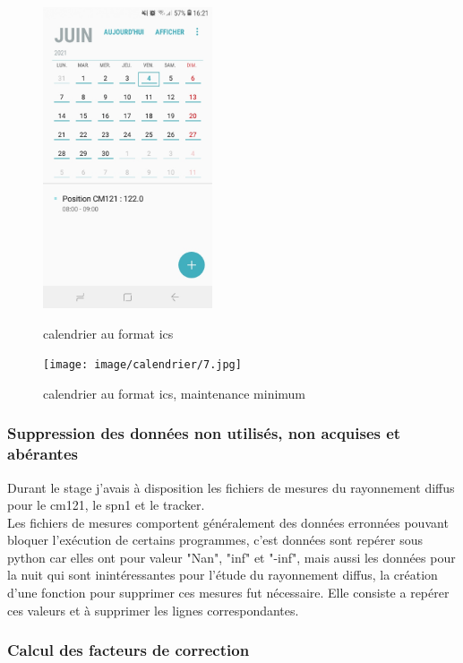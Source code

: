 \documentclass[12pt,a4paper]{article}
\begin{document}
\begin{flushleft}
\begin{figure}[H]
    \begin{minipage}[c]{.46\linewidth}
        \centering
        \includegraphics[width=5cm]{image/calendrier/4.jpg} 
		\caption{calendrier au format ics}
    \end{minipage}
    \hfill%
    \begin{minipage}[c]{.46\linewidth}
        \centering
        \texttt{[image: image/calendrier/7.jpg]} 
        \caption{calendrier au format ics, maintenance minimum}
    \end{minipage}
\end{figure}

\subsubsection{Suppression des données non utilisés, non acquises et abérantes}

Durant le stage j'avais à disposition les fichiers de mesures du rayonnement diffus pour le cm121, le spn1 et le tracker.\\
Les fichiers de mesures comportent généralement des données erronnées pouvant bloquer l'exécution de certains programmes, c'est données sont repérer sous python car elles ont pour valeur "Nan", "inf" et "-inf", mais aussi les données pour la nuit qui sont inintéressantes pour l'étude du rayonnement diffus, la création d'une fonction pour supprimer ces mesures fut nécessaire. Elle consiste a repérer ces valeurs et à supprimer les lignes correspondantes.

\subsubsection{Calcul des facteurs de correction}


\end{flushleft}
\end{document}
